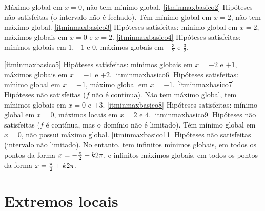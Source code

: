 \begin{exo}
\begin{sol}
Máximo global em $x=0$, não tem mínimo global.
\eqref{itminmaxbasico2} Hipóteses não satisfeitas (o intervalo não é fechado).
Tém mínimo global em $x=2$, não tem máximo global.
\eqref{itminmaxbasico3} Hipóteses satisfeitas: mínimo global em $x=2$, máximos
globais em $x=0$ e $x=2$.
\eqref{itminmaxbasico4} Hipóteses satisfeitas: 
mínímos globais em $1,-1$ e $0$, máximos globais em 
$-\tfrac32$ e $\tfrac32$.
\begin{center}
\begin{bmlimage}\end{bmlimage}
\end{center}
\eqref{itminmaxbasico5} Hipóteses satisfeitas: mínimos globais em $x=-2$ e
$+1$, máximos globais em $x=-1$ e $+2$.
\eqref{itminmaxbasico6} Hipóteses satisfeitas: mínimo global em $x=+1$, máximo
global em $x=-1$.
\eqref{itminmaxbasico7} Hipóteses não satisfeitas ($f$ não é contínua). Não tem
máximo global, tem mínimos globais em $x=0$ e $+3$.
\eqref{itminmaxbasico8} Hipóteses satisfeitas: mínimo global em $x=0$, máximos
locais em $x=2$ e $4$.
\eqref{itminmaxbasico9} Hipóteses não satisfeitas ($f$ é contínua, mas o
domínio não é limitado). Tém mínimo global em $x=0$, não possui máximo global.
\eqref{itminmaxbasico11} Hipóteses não satisfeitas (intervalo não
limitado). No entanto, tem infinitos mínimos
globais, em todos os pontos da forma $x=-\tfrac{\pi}{2}+k2\pi$, e infinitos
máximos globais, em todos os pontos da forma $x=\tfrac{\pi}{2}+k2\pi$.
\end{sol}
\end{exo}

\section{Extremos locais}

